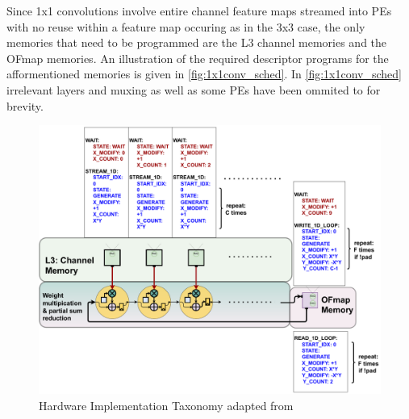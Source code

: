 Since 1x1 convolutions involve entire channel feature maps streamed into PEs
with no reuse within a feature map occuring as in the 3x3 case, the only
memories that need to be programmed are the L3 channel memories and the OFmap
memories. An illustration of the required descriptor programs for the
afformentioned memories is given in \autoref{fig:1x1conv_sched}. In
\autoref{fig:1x1conv_sched} irrelevant layers and muxing as well as some PEs
have been ommited to for brevity.

\begin{figure}[ht]
    \centering
    \includegraphics[scale=0.495]{fig/1x1conv_sched.pdf}
    \caption{Hardware Implementation Taxonomy adapted from \cite{maestro}}
    \label{fig:1x1conv_sched}
\end{figure}

